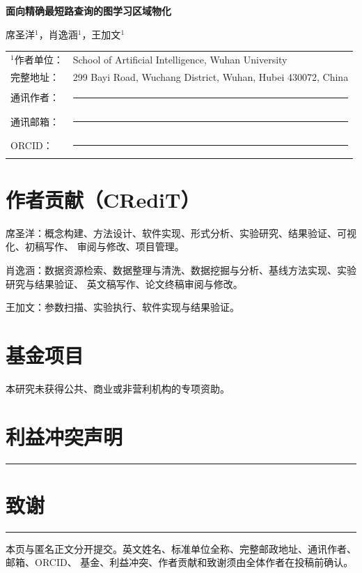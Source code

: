 \documentclass[UTF8,a4paper,11pt]{ctexart}
\begin{document}
\begin{center}
  {\LARGE\bfseries 面向精确最短路查询的图学习区域物化\par}
  \vspace{2em}
  {\large 席圣洋$^{1}$，肖逸涵$^{1}$，王加文$^{1}$\par}
\end{center}

\vspace{1.5em}

\begin{tabularx}{\textwidth}{@{}lX@{}}
  $^{1}$作者单位： & School of Artificial Intelligence, Wuhan University \\
  完整地址： & 299 Bayi Road, Wuchang District, Wuhan, Hubei 430072, China \\
  通讯作者： & \rule{0.38\linewidth}{0.4pt} \\
  通讯邮箱： & \rule{0.38\linewidth}{0.4pt} \\
  ORCID： & \rule{0.58\linewidth}{0.4pt} \\
\end{tabularx}

\section*{作者贡献（CRediT）}

席圣洋：概念构建、方法设计、软件实现、形式分析、实验研究、结果验证、可视化、初稿写作、
审阅与修改、项目管理。

肖逸涵：数据资源检索、数据整理与清洗、数据挖掘与分析、基线方法实现、实验研究与结果验证、
英文稿写作、论文终稿审阅与修改。

王加文：参数扫描、实验执行、软件实现与结果验证。

\section*{基金项目}

本研究未获得公共、商业或非营利机构的专项资助。

\section*{利益冲突声明}

\rule{\linewidth}{0.4pt}

\section*{致谢}

\rule{\linewidth}{0.4pt}

\vfill
\small 本页与匿名正文分开提交。英文姓名、标准单位全称、完整邮政地址、通讯作者、邮箱、ORCID、
基金、利益冲突、作者贡献和致谢须由全体作者在投稿前确认。
\end{document}
